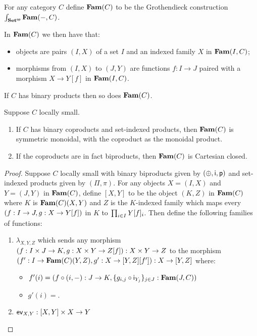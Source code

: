 \begin{definition}
For any category $C$ define $\mathbf{Fam}(C)$ to be the Grothendieck construction
$\int_{\mathbf{Set}^{\mathsf{op}}}\mathbf{Fam}(-,C)$.
\end{definition}

In $\mathbf{Fam}(C)$ we then have that:
\begin{itemize}
\item objects are pairs $(I, X)$ of a set $I$ and an indexed family $X$ in $\mathbf{Fam}(I,C)$;
\item morphisms from $(I, X)$ to $(J, Y)$ are functions $f: I \to J$ paired with a morphism $X \to Y[f]$ in
$\mathbf{Fam}(I,C)$.
\end{itemize}

\begin{proposition}
If $C$ has binary products then so does $\mathbf{Fam}(C)$.
\end{proposition}

\begin{proposition}
Suppose $C$ locally small.
\begin{enumerate}
\item If $C$ has binary coproducts and set-indexed products, then $\mathbf{Fam}(C)$ is symmetric monoidal, with the
coproduct as the monoidal product.
\item If the coproducts are in fact biproducts, then $\mathbf{Fam}(C)$ is Cartesian closed.
\end{enumerate}
\end{proposition}

\begin{proof}
Suppose $C$ locally small with binary biproducts given by $(\oplus,\mathsf{i},\mathsf{p})$ and set-indexed products
given by $(\Pi,\pi)$. For any objects $X = (I, X)$ and $Y = (J, Y)$ in $\mathbf{Fam}(C)$, define $[X, Y]$ to be the
object $(K,Z)$ in $\mathbf{Fam}(C)$ where $K$ is $\mathbf{Fam}(C)(X,Y)$ and $Z$ is the $K$-indexed family which maps every
$(f: I \to J, g: X \to Y[f])$ in $K$ to $\prod_{i \in I}Y[f]_i$. Then define the following
families of functions:

\begin{enumerate}
\item $\lambda_{X,Y,Z}$ which sends any morphism $(f: I \times J \to K, g: X \times Y \to Z[f]): X
\times Y \to Z$ to the morphism $(f': I \to \mathbf{Fam}(C)(Y,Z), g': X \to [Y, Z][f']): X \to [Y, Z]$ where:
\begin{itemize}
\item $f'(i) = (f \circ (i, -): J \to K, \{g_{i,j} \circ \mathsf{i}_{Y_j}\}_{j \in J}: \mathbf{Fam}(J,C))$
\item $g'(i) = $.
\end{itemize}
\item $\mathsf{ev}_{X,Y}: [X, Y] \times X \to Y$
\end{enumerate}
\end{proof}

